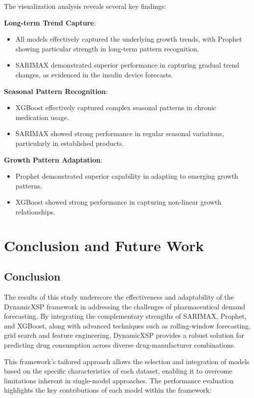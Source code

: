 \documentclass[journal]{IEEEtran}
\begin{document}
The visualization analysis reveals several key findings:

\textbf{Long-term Trend Capture}:
\begin{itemize}
\item All models effectively captured the underlying growth trends, with Prophet showing particular strength in long-term pattern recognition.
\item SARIMAX demonstrated superior performance in capturing gradual trend changes, as evidenced in the insulin device forecasts.
\end{itemize}

\textbf{Seasonal Pattern Recognition}:
\begin{itemize}
\item XGBoost effectively captured complex seasonal patterns in chronic medication usage.
\item SARIMAX showed strong performance in regular seasonal variations, particularly in established products.
\end{itemize}

\textbf{Growth Pattern Adaptation}:
\begin{itemize}
\item Prophet demonstrated superior capability in adapting to emerging growth patterns.
\item XGBoost showed strong performance in capturing non-linear growth relationships.
\end{itemize}


\section{Conclusion and Future Work}

\subsection{Conclusion}

The results of this study underscore the effectiveness and adaptability of the DynamicXSP framework in addressing the challenges of pharmaceutical demand forecasting. By integrating the complementary strengths of SARIMAX, Prophet, and XGBoost, along with advanced techniques such as rolling-window forecasting, grid search and feature engineering, DynamicXSP provides a robust solution for predicting drug consumption across diverse drug-manufacturer combinations.

This framework's tailored approach allows the selection and integration of models based on the specific characteristics of each dataset, enabling it to overcome limitations inherent in single-model approaches. The performance evaluation highlights the key contributions of each model within the framework: 
\end{document}
